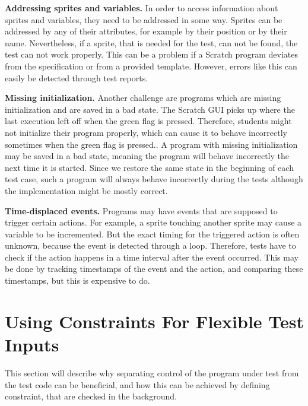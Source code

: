 \textbf{Addressing sprites and variables.}
In order to access information about sprites and variables, they need to be addressed in some way.
Sprites can be addressed by any of their attributes, for example by their position or by their name.
Nevertheless, if a sprite, that is needed for the test, can not be found, the test can not work properly.
This can be a problem if a Scratch program deviates from the specification or from a provided template.
However, errors like this can easily be detected through test reports.
\parspace

\textbf{Missing initialization.}
Another challenge are programs which are missing initialization and are saved in a bad state.
The Scratch GUI picks up where the last execution left off when the green flag is pressed.
Therefore, students might not initialize their program properly,
which can cause it to behave incorrectly sometimes when the green flag is pressed..
A program with missing initialization may be saved in a bad state,
meaning the program will behave incorrectly the next time it is started.
Since we restore the same state in the beginning of each test case,
such a program will always behave incorrectly during the tests although the implementation might be mostly correct.
\parspace

\textbf{Time-displaced events.}
Programs may have events that are supposed to trigger certain actions.
For example, a sprite touching another sprite may cause a variable to be incremented.
But the exact timing for the triggered action is often unknown, because the event is detected through a loop.
Therefore, tests have to check if the action happens in a time interval after the event occurred.
This may be done by tracking timestamps of the event and the action, and comparing these timestamps,
but this is expensive to do.
\parspace

\chapter{Using Constraints For Flexible Test Inputs}
\label{cha:using_constraints_for_flexible_test_inputs}

This section will describe why separating control of the program under test from the test code can be beneficial,
and how this can be achieved by defining constraint, that are checked in the background.

